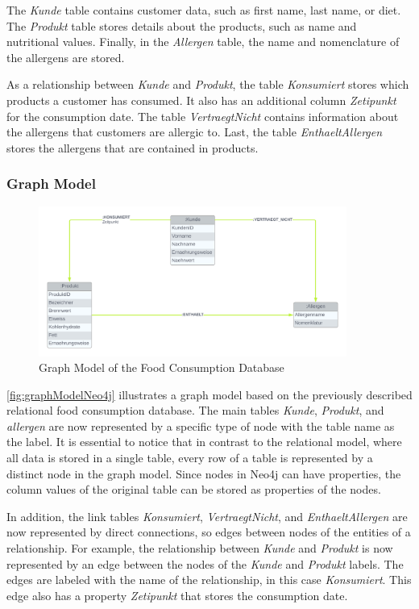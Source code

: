 The \textit{Kunde} table contains customer data, such as first name, last name, or diet. The \textit{Produkt} table stores details about the products, such as name and nutritional values. Finally, in the \textit{Allergen} table, the name and nomenclature of the allergens are stored.

As a relationship between \textit{Kunde} and \textit{Produkt}, the table \textit{Konsumiert} stores which products a customer has consumed. It also has an additional column \textit{Zetipunkt} for the consumption date. The table \textit{VertraegtNicht} contains information about the allergens that customers are allergic to. Last, the table \textit{EnthaeltAllergen} stores the allergens that are contained in products.

\subsubsection*{Graph Model}

\begin{figure}[H]
    \centering
    \caption{Graph Model of the Food Consumption Database}\label{fig:graphModelNeo4j}
    \includegraphics[width=0.9\textwidth]{images/neo4j_example_graph_model.png}
\end{figure}

\autoref{fig:graphModelNeo4j} illustrates a graph model based on the previously described relational food consumption database. The main tables \textit{Kunde}, \textit{Produkt}, and \textit{allergen} are now represented by a specific type of node with the table name as the label. It is essential to notice that in contrast to the relational model, where all data is stored in a single table, every row of a table is represented by a distinct node in the graph model. Since nodes in Neo4j can have properties, the column values of the original table can be stored as properties of the nodes.

In addition, the link tables \textit{Konsumiert}, \textit{VertraegtNicht}, and \textit{EnthaeltAllergen} are now represented by direct connections, so edges between nodes of the entities of a relationship. For example, the relationship between \textit{Kunde} and \textit{Produkt} is now represented by an edge between the nodes of the \textit{Kunde} and \textit{Produkt} labels. The edges are labeled with the name of the relationship, in this case \textit{Konsumiert}. This edge also has a property \textit{Zetipunkt} that stores the consumption date.

